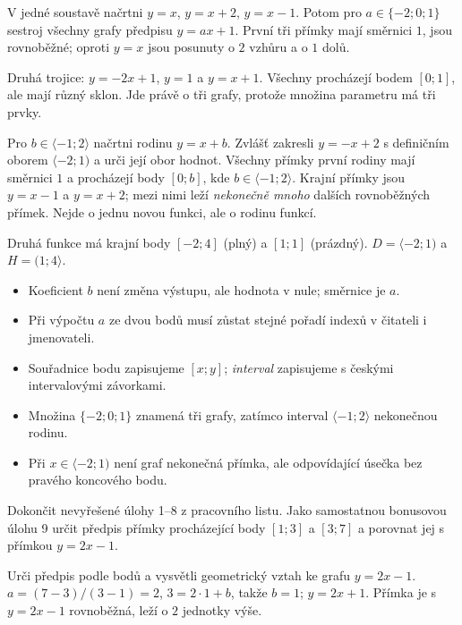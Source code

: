 \documentclass[11pt,a4paper]{article}
\begin{document}
\begin{zadaniReseniBox}[title={Samostatná práce 3}]
V jedné soustavě načrtni $y=x$, $y=x+2$, $y=x-1$.
Potom pro $a\in\{-2;0;1\}$ sestroj všechny grafy předpisu $y=ax+1$.
\tcblower
První tři přímky mají směrnici $1$, jsou rovnoběžné; oproti $y=x$ jsou
posunuty o $2$ vzhůru a o $1$ dolů.\par
Druhá trojice: $y=-2x+1$, $y=1$ a $y=x+1$.
Všechny procházejí bodem $[0;1]$, ale mají různý sklon.
Jde právě o tři grafy, protože množina parametru má tři prvky.
\end{zadaniReseniBox}

\newpage
\begin{zadaniReseniBox}[title={Samostatná práce 4}]
Pro $b\in\langle-1;2\rangle$ načrtni rodinu $y=x+b$.
Zvlášť zakresli $y=-x+2$ s definičním oborem $\langle-2;1)$ a urči její obor hodnot.
\tcblower
Všechny přímky první rodiny mají směrnici $1$ a procházejí body
$[0;b]$, kde $b\in\langle-1;2\rangle$. Krajní přímky jsou $y=x-1$ a $y=x+2$;
mezi nimi leží \emph{nekonečně mnoho} dalších rovnoběžných přímek.
Nejde o jednu novou funkci, ale o rodinu funkcí.\par
Druhá funkce má krajní body $[-2;4]$ (plný) a $[1;1]$ (prázdný).
$D=\langle-2;1)$ a $H=(1;4\rangle$.
\end{zadaniReseniBox}

\begin{itemize}
\item Koeficient $b$ není změna výstupu, ale hodnota v nule; směrnice je $a$.
\item Při výpočtu $a$ ze dvou bodů musí zůstat stejné pořadí indexů v čitateli i jmenovateli.
\item Souřadnice bodu zapisujeme $[x;y]$; \emph{interval} zapisujeme s českými intervalovými závorkami.
\item Množina $\{-2;0;1\}$ znamená tři grafy, zatímco interval $\langle-1;2\rangle$ nekonečnou rodinu.
\item Při $x\in\langle-2;1)$ není graf nekonečná přímka, ale odpovídající úsečka bez pravého koncového bodu.
\end{itemize}

Dokončit nevyřešené úlohy 1–8 z pracovního listu. Jako samostatnou bonusovou úlohu 9
určit předpis přímky procházející body $[1;3]$ a $[3;7]$ a porovnat jej s přímkou $y=2x-1$.

\begin{zadaniReseniBox}[title={Rozšíření 1}]
Urči předpis podle bodů a vysvětli geometrický vztah ke grafu $y=2x-1$.
\tcblower
$a=(7-3)/(3-1)=2$, $3=2\cdot1+b$, takže $b=1$;
$y=2x+1$. Přímka je s $y=2x-1$ rovnoběžná, leží o $2$ jednotky výše.
\end{zadaniReseniBox}
\end{document}
